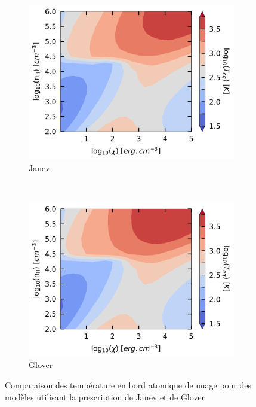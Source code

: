 \begin{figure}[!h]
    \centering
    \begin{subfigure}[t]{0.49\textwidth} %
        \centering \includegraphics[trim = {0 0 0 0 },clip,width=1\textwidth]{figure/H2/grid_janev/mapTba.pdf}
        \caption{Janev}
    \end{subfigure}
    ~ 
    \begin{subfigure}[t]{0.49\textwidth}
        \centering \includegraphics[trim = {0 0 0 0 },clip,width=1\textwidth]{figure/H2/grid_glover/mapTba.pdf}
        \caption{Glover}
    \end{subfigure}
    \caption{Comparaison des température en bord atomique de nuage pour des modèles utilisant la prescription de Janev et de Glover}
    \label{fig:H2:JanevGlover:Tba}
\end{figure}


